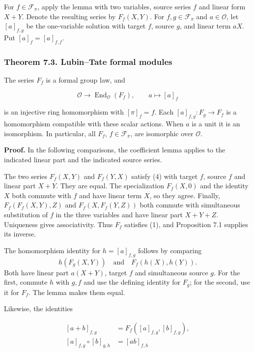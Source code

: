 \documentclass[11pt,a4paper]{article}
\begin{document}
For \(f\in\mathcal F_\pi\), apply the lemma with two variables, source
series \(f\) and linear form \(X+Y\). Denote the resulting series by
\(F_f(X,Y)\). For \(f,g\in\mathcal F_\pi\) and \(a\in\mathcal O\), let
\([a]_{f,g}\) be the one-variable solution with target \(f\), source
\(g\), and linear term \(aX\). Put \([a]_f=[a]_{f,f}\).

\subsubsection{Theorem 7.3. Lubin--Tate formal
modules}\label{theorem-7.3.-lubintate-formal-modules}

The series \(F_f\) is a formal group law, and

\[
\mathcal O\longrightarrow\operatorname{End}_{\mathcal O}(F_f),
\qquad a\longmapsto[a]_f
\tag{6}
\]

is an injective ring homomorphism with \([\pi]_f=f\). Each
\([a]_{f,g}:F_g\to F_f\) is a homomorphism compatible with these scalar
actions. When \(a\) is a unit it is an isomorphism. In particular, all
\(F_f\), \(f\in\mathcal F_\pi\), are isomorphic over \(\mathcal O\).

\textbf{Proof.} In the following comparisons, the coefficient lemma
applies to the indicated linear part and the indicated source series.

The two series \(F_f(X,Y)\) and \(F_f(Y,X)\) satisfy (4) with target
\(f\), source \(f\) and linear part \(X+Y\). They are equal. The
specialization \(F_f(X,0)\) and the identity \(X\) both commute with
\(f\) and have linear term \(X\), so they agree. Finally,
\(F_f(F_f(X,Y),Z)\) and \(F_f(X,F_f(Y,Z))\) both commute with
simultaneous substitution of \(f\) in the three variables and have
linear part \(X+Y+Z\). Uniqueness gives associativity. Thus \(F_f\)
satisfies (1), and Proposition 7.1 supplies its inverse.

The homomorphism identity for \(h=[a]_{f,g}\) follows by comparing \[
h(F_g(X,Y))\quad\text{and}\quad F_f(h(X),h(Y)).
\] Both have linear part \(a(X+Y)\), target \(f\) and simultaneous
source \(g\). For the first, commute \(h\) with \(g,f\) and use the
defining identity for \(F_g\); for the second, use it for \(F_f\). The
lemma makes them equal.

Likewise, the identities

\[
\begin{aligned}
[a+b]_{f,g}&=F_f([a]_{f,g},[b]_{f,g}),\\
[a]_{f,g}\circ[b]_{g,h}&=[ab]_{f,h}
\end{aligned}
\tag{7}
\]
\end{document}
